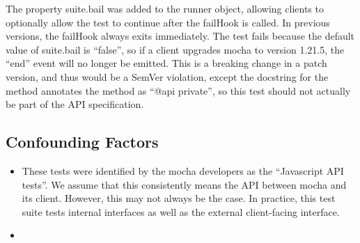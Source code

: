 The property suite.bail was added to the runner object, allowing
clients to optionally allow the test to continue after the failHook is
called. In previous versions, the failHook always exits
immediately. The test fails because the default value of suite.bail is
“false”, so if a client upgrades mocha to version 1.21.5, the “end”
event will no longer be emitted. This is a breaking change in a patch
version, and thus would be a SemVer violation, except the docstring
for the method annotates the method as “@api private”, so this test
should not actually be part of the API specification.

\subsection{Confounding Factors}
\begin{itemize}
\item These tests were identified by the mocha developers as the
  ``Javascript API tests''. We assume that this consistently means the
  API between mocha and its client. However, this may not always be
  the case. In practice, this test suite tests internal interfaces as
  well as the external client-facing interface.
\item 
\end{itemize}
